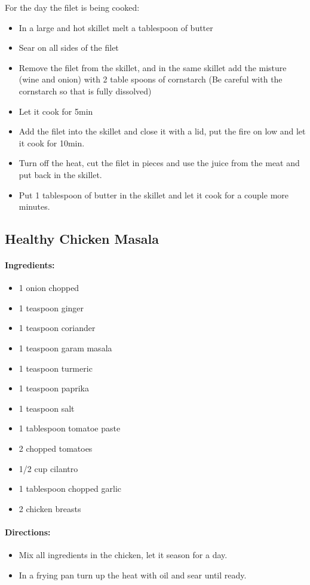 \documentclass{article}
\begin{document}
For the day the filet is being cooked:
\begin{itemize}
	\item In a large and hot skillet melt a tablespoon of butter
	\item Sear on all sides of the filet
	\item Remove the filet from the skillet, and in the same skillet add the misture (wine and onion) with 2 table spoons of cornstarch (Be careful with the cornstarch so that is fully dissolved)
	\item Let it cook for 5min
	\item Add the filet into the skillet and close it with a lid, put the fire on low and let it cook for 10min.
	\item Turn off the heat, cut the filet in pieces and use the juice from the meat and put back in the skillet. 
	\item Put 1 tablespoon of butter in the skillet and let it cook for a couple more minutes.
\end{itemize}

\subsection{Healthy Chicken Masala}

\paragraph{Ingredients:}

\begin{itemize}
	\item 1 onion chopped
	\item 1 teaspoon ginger
	\item 1 teaspoon coriander
	\item 1 teaspoon garam masala
	\item 1 teaspoon turmeric
	\item 1 teaspoon paprika
	\item 1 teaspoon salt
	\item 1 tablespoon tomatoe paste
	\item 2 chopped tomatoes
	\item 1/2 cup cilantro
	\item 1 tablespoon chopped garlic
	\item 2 chicken breasts
\end{itemize}

\paragraph{Directions:}
\begin{itemize}
	\item Mix all ingredients in the chicken, let it season for a day. 
	\item In a frying pan turn up the heat with oil and sear until ready.
\end{itemize}
\end{document}
